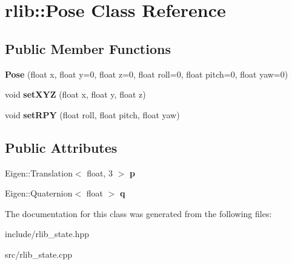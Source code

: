 \hypertarget{classrlib_1_1Pose}{\section{rlib\-:\-:Pose Class Reference}
\label{classrlib_1_1Pose}
}
\subsection*{Public Member Functions}
\begin{DoxyCompactItemize}
\item 
\hypertarget{classrlib_1_1Pose_a89018f33db4278d47440d42d515ffccb}{{\bfseries Pose} (float x, float y=0, float z=0, float roll=0, float pitch=0, float yaw=0)}\label{classrlib_1_1Pose_a89018f33db4278d47440d42d515ffccb}

\item 
\hypertarget{classrlib_1_1Pose_a5b2693a81537396e831788fb4597c908}{void {\bfseries set\-X\-Y\-Z} (float x, float y, float z)}\label{classrlib_1_1Pose_a5b2693a81537396e831788fb4597c908}

\item 
\hypertarget{classrlib_1_1Pose_a4342dd9f96dc8efe40fca92f8a6b31be}{void {\bfseries set\-R\-P\-Y} (float roll, float pitch, float yaw)}\label{classrlib_1_1Pose_a4342dd9f96dc8efe40fca92f8a6b31be}

\end{DoxyCompactItemize}
\subsection*{Public Attributes}
\begin{DoxyCompactItemize}
\item 
\hypertarget{classrlib_1_1Pose_a79943a3bc939401f14ab8feadc6f9fb0}{Eigen\-::\-Translation$<$ float, 3 $>$ {\bfseries p}}\label{classrlib_1_1Pose_a79943a3bc939401f14ab8feadc6f9fb0}

\item 
\hypertarget{classrlib_1_1Pose_ac598a727181b9ffbe5ac865239390437}{Eigen\-::\-Quaternion$<$ float $>$ {\bfseries q}}\label{classrlib_1_1Pose_ac598a727181b9ffbe5ac865239390437}

\end{DoxyCompactItemize}


The documentation for this class was generated from the following files\-:\begin{DoxyCompactItemize}
\item 
include/rlib\-\_\-state.\-hpp\item 
src/rlib\-\_\-state.\-cpp\end{DoxyCompactItemize}
